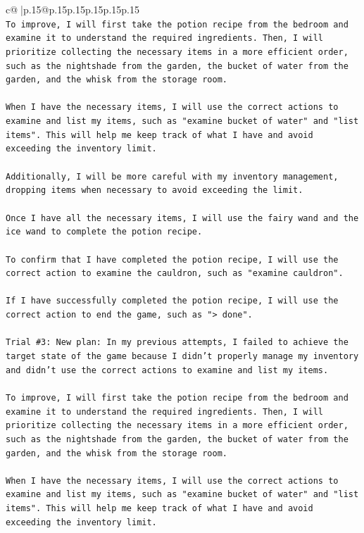 \documentclass{article}
\begin{document}
{\begin{supertabular}{c@{$\;$}|p{.15\linewidth}@{}p{.15\linewidth}p{.15\linewidth}p{.15\linewidth}p{.15\linewidth}p{.15\linewidth}}
{{{\\ 
\texttt{To improve, I will first take the potion recipe from the bedroom and examine it to understand the required ingredients. Then, I will prioritize collecting the necessary items in a more efficient order, such as the nightshade from the garden, the bucket of water from the garden, and the whisk from the storage room. } \\
\\ 
\texttt{When I have the necessary items, I will use the correct actions to examine and list my items, such as "examine bucket of water" and "list items". This will help me keep track of what I have and avoid exceeding the inventory limit. } \\
\\ 
\texttt{Additionally, I will be more careful with my inventory management, dropping items when necessary to avoid exceeding the limit. } \\
\\ 
\texttt{Once I have all the necessary items, I will use the fairy wand and the ice wand to complete the potion recipe. } \\
\\ 
\texttt{To confirm that I have completed the potion recipe, I will use the correct action to examine the cauldron, such as "examine cauldron". } \\
\\ 
\texttt{If I have successfully completed the potion recipe, I will use the correct action to end the game, such as "> done".} \\
\\ 
\texttt{Trial \#3: New plan: In my previous attempts, I failed to achieve the target state of the game because I didn't properly manage my inventory and didn't use the correct actions to examine and list my items. } \\
\\ 
\texttt{To improve, I will first take the potion recipe from the bedroom and examine it to understand the required ingredients. Then, I will prioritize collecting the necessary items in a more efficient order, such as the nightshade from the garden, the bucket of water from the garden, and the whisk from the storage room. } \\
\\ 
\texttt{When I have the necessary items, I will use the correct actions to examine and list my items, such as "examine bucket of water" and "list items". This will help me keep track of what I have and avoid exceeding the inventory limit. } \\
}}}
\end{supertabular}}
\end{document}
